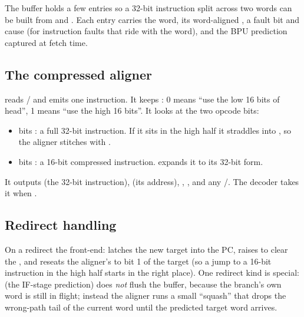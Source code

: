 The buffer holds a few entries so a 32-bit instruction split across two words can
be built from  and . Each entry carries the word, its
word-aligned , a fault bit and cause (for instruction faults that ride
with the word), and the BPU prediction captured at fetch time.


\subsection{The compressed aligner}
 reads / and emits one instruction.
It keeps : 0 means ``use the low 16 bits of head'', 1 means
``use the high 16 bits''. It looks at the two opcode bits:
\begin{itemize}[leftmargin=1.4em,itemsep=1pt]
\item bits : a full 32-bit instruction. If it sits in the high half it
  straddles into , so the aligner stitches  with
  .
\item bits : a 16-bit compressed instruction.  expands it
  to its 32-bit form.
\end{itemize}
It outputs  (the 32-bit instruction),  (its
address), , , and any
/. The decoder takes it when
.

\subsection{Redirect handling}
On a redirect the front-end: latches the new target into the PC, raises
 to clear the , and reseats the aligner's
 to bit 1 of the target (so a jump to a 16-bit instruction in
the high half starts in the right place). One redirect kind is special:
 (the IF-stage prediction) does \emph{not} flush the buffer,
because the branch's own word is still in flight; instead the aligner runs a
small ``squash'' that drops the wrong-path tail of the current word until the
predicted target word arrives.

